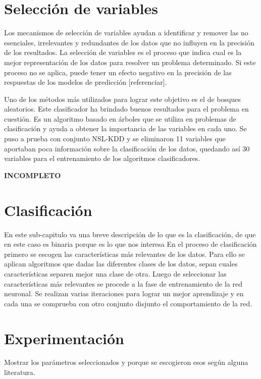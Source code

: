 \section{Selección de variables}
Los mecanismos de selección de variables ayudan a identificar y remover las no esenciales, irrelevantes y redundantes de los datos que no influyen en la precisión de los resultados. La selección de variables es el proceso que indica cual es la mejor representación de los datos para resolver un problema determinado. Si este proceso no se aplica, puede tener un efecto negativo en la precisión de las respuestas de los modelos de predicción [referenciar].

Uno de los métodos más utilizados para lograr este objetivo es el de bosques aleatorios. Este clasificador ha brindado buenos resultados para el problema en cuestión. Es un algoritmo basado en árboles que se utiliza en problemas de clasificación y ayuda a obtener la importancia de las variables en cada uno. Se puso a prueba con conjunto NSL-KDD y se eliminaron 11 variables que aportaban poca información sobre la clasificación de los datos, quedando así 30 variables para el entrenamiento de los algoritmos clasificadores.

\textbf{INCOMPLETO}
\section{Clasificación}
En este sub-capitulo va una breve descripción de lo que es la clasificación, de que en este caso es binaria porque es lo que nos interesa
En el proceso de clasificación primero se escogen las características más relevantes de los datos. Para ello se aplican algoritmos que dadas las diferentes clases de los datos, sepan cuales características separen mejor una clase de otra. Luego de seleccionar las características más relevantes se procede a la fase de entrenamiento de la red neuronal. Se realizan varias iteraciones para lograr un mejor aprendizaje y en cada una se comprueba con otro conjunto disjunto el comportamiento de la red.


\section{Experimentación}
Mostrar los parámetros seleccionados y porque se escogieron esos según alguna literatura.

